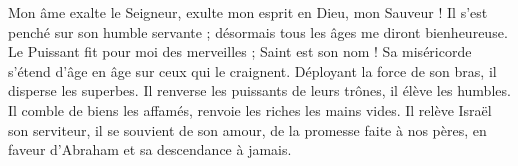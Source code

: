 Mon âme exalte le Seigneur,
\versseparator
exulte mon esprit en Dieu, mon Sauveur !
\versseparator
Il s’est penché sur son humble servante ; désormais tous les âges me diront bienheureuse.
\versseparator
Le Puissant fit pour moi des merveilles ; Saint est son nom !
\versseparator
Sa miséricorde s’étend d’âge en âge sur ceux qui le craignent.
\versseparator
Déployant la force de son bras, il disperse les superbes.
\versseparator
Il renverse les puissants de leurs trônes, il élève les humbles.
\versseparator
Il comble de biens les affamés, renvoie les riches les mains vides.
\versseparator
Il relève Israël son serviteur, il se souvient de son amour,
\versseparator
de la promesse faite à nos pères, en faveur d’Abraham et sa descendance à jamais.
